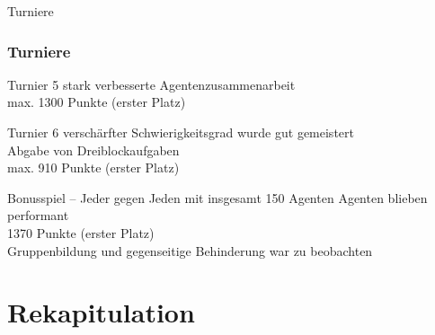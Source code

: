 \documentclass[aspectratio=169]{beamer} %
\begin{document}
\begin{frame}{Turniere}
\frametitle{Turniere}
\begin{block}{Turnier 5}
\textcolor{teal}{\smiley{}} stark verbesserte Agentenzusammenarbeit \\
\textcolor{teal}{\frownie{}} max. 1300 Punkte (erster Platz)  
\end{block}
\begin{block}{Turnier 6}
\textcolor{teal}{\smiley{}} verschärfter Schwierigkeitsgrad wurde gut gemeistert \\
\textcolor{teal}{\smiley{}} Abgabe von Dreiblockaufgaben \\
\textcolor{teal}{\smiley{}} max. 910 Punkte (erster Platz) \\
\end{block}
\begin{block}{Bonusspiel -- Jeder gegen Jeden mit insgesamt 150 Agenten}
\textcolor{teal}{\smiley{}} Agenten blieben performant \\
\textcolor{teal}{\smiley{}} 1370 Punkte (erster Platz)  \\
\textcolor{red}{\frownie{}} Gruppenbildung und gegenseitige Behinderung war zu beobachten
\end{block}
\end{frame}

\section{Rekapitulation}
\end{document}
